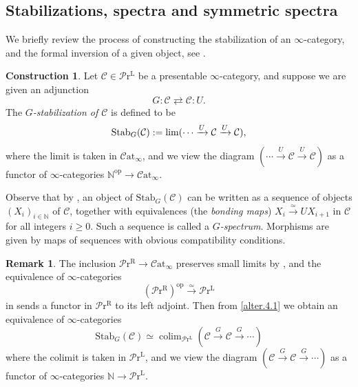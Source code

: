 \documentclass[11pt, a4paper]{amsart}
\theoremstyle{definition}
\newtheorem{const}[thm]{Construction}
\newtheorem{rmk}[thm]{Remark}
\numberwithin{equation}{subsection}
\newcommand{\N}{\mathbb{N}}
\newcommand{\colim}{\operatorname{colim}}		 %
\newcommand{\limit}{\mathop{\rm lim}}
\newcommand{\Stab}{\mathrm{Stab}}
\newcommand{\cC}{\mathcal{C}}
\newcommand{\LPr}{\mathcal{P}\mathrm{r}^{\mathrm{L}}}
\newcommand{\RPr}{\mathcal{P}\mathrm{r}^{\mathrm{R}}}
\newcommand{\infC}{\mathcal{C}}
\newcommand{\infCat}{\mathcal{C}\mathrm{at}}
\begin{document}
\subsection{Stabilizations, spectra and symmetric spectra}\label{sec:spectra} We briefly review the process of constructing the stabilization of an $\infty$-category, and the formal inversion of a given object, see \cite[\S 2.2]{RobaloThesispublished}.

\begin{const}
\label{alter.4}
Let $\infC\in \LPr$ be a presentable $\infty$-category, and suppose we are given an adjunction
\begin{equation}
\label{alter.4.4}
G:
\infC \rightleftarrows \infC
:U.
\end{equation}
The \emph{$G$-stabilization of $\infC$} is defined to be\index[notation]{StabGC @ $\Stab_G(\infC)$}
\begin{equation}
\label{alter.4.3}
\Stab_G(\infC)
:=
\limit(\cdots \xrightarrow{U}\infC \xrightarrow{U}\infC),
\end{equation}
where the limit is taken in $\infCat_\infty$, and we view the diagram $(\cdots \xrightarrow{U}\infC \xrightarrow{U}\infC)$ as a functor of $\infty$-categories $\N^\mathrm{op}\to \infCat_\infty$.


Observe that by \cite[Corollary 3.3.3.2]{HTT}, an object of $\Stab_G(\infC)$ can be written as a sequence of objects $(X_i)_{i\in \mathbb{N}}$ of $\infC$,
together with equivalences (the \emph{bonding maps}) $X_i \xrightarrow{\simeq} U X_{i+1}$ in $\cC$ for all integers $i\geq 0$. 
Such a sequence is called a \emph{$G$-spectrum}. 
Morphisms are given by maps of sequences with obvious compatibility conditions. 
 \begin{rmk} 
The inclusion $\RPr\to \infCat_\infty$ preserves small limits by \cite[Proposition 5.5.7.6]{HTT}, and the equivalence of $\infty$-categories
\begin{equation}
\label{alter.4.1}
(\RPr)^\mathrm{op}\xrightarrow{\simeq} \LPr
\end{equation}
in \cite[Corollary 5.5.3.4]{HTT} sends a functor in $\RPr$ to its left adjoint.
Then from \eqref{alter.4.1} we obtain an equivalence of $\infty$-categories
\begin{equation}
\label{alter.4.2}
\Stab_G(\infC)
\simeq
\colim_{\LPr}(\infC\xrightarrow{G}\infC \xrightarrow{G}\cdots)
\end{equation}
where the colimit is taken in $\LPr$, and we view the diagram $(\infC\xrightarrow{G}\infC \xrightarrow{G}\cdots)$ as a functor of $\infty$-categories $\N\to \LPr$.
\end{rmk}



\end{const}
\end{document}
